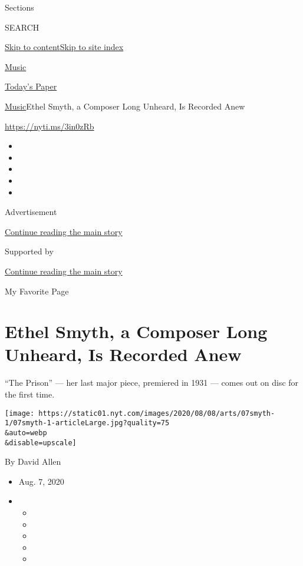 Sections

SEARCH

\protect\hyperlink{site-content}{Skip to
content}\protect\hyperlink{site-index}{Skip to site index}

\href{https://www.nytimes.com/section/arts/music}{Music}

\href{https://myaccount.nytimes.com/auth/login?response_type=cookie\&client_id=vi}{}

\href{https://www.nytimes.com/section/todayspaper}{Today's Paper}

\href{/section/arts/music}{Music}\textbar{}Ethel Smyth, a Composer Long
Unheard, Is Recorded Anew

\href{https://nyti.ms/3in0zRb}{https://nyti.ms/3in0zRb}

\begin{itemize}
\item
\item
\item
\item
\item
\end{itemize}

Advertisement

\protect\hyperlink{after-top}{Continue reading the main story}

Supported by

\protect\hyperlink{after-sponsor}{Continue reading the main story}

My Favorite Page

\hypertarget{ethel-smyth-a-composer-long-unheard-is-recorded-anew}{%
\section{Ethel Smyth, a Composer Long Unheard, Is Recorded
Anew}\label{ethel-smyth-a-composer-long-unheard-is-recorded-anew}}

``The Prison'' --- her last major piece, premiered in 1931 --- comes out
on disc for the first time.

\texttt{[image: https://static01.nyt.com/images/2020/08/08/arts/07smyth-1/07smyth-1-articleLarge.jpg?quality=75\\\&auto=webp\\\&disable=upscale]}

By David Allen

\begin{itemize}
\item
  Aug. 7, 2020
\item
  \begin{itemize}
  \item
  \item
  \item
  \item
  \item
  \end{itemize}
\end{itemize}

